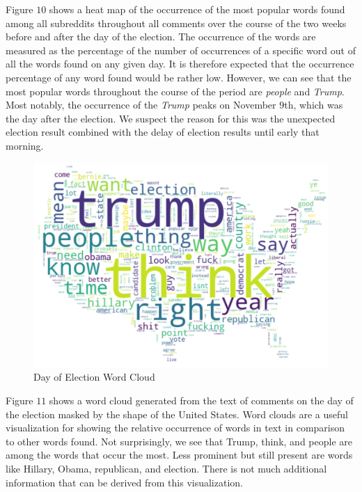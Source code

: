 \documentclass[letterpaper]{article}
\begin{document}
Figure $10$ shows a heat map of the occurrence of the most popular words found among all subreddits throughout all comments over the course of the two weeks before and after the day of the election. The occurrence of the words are measured as the percentage of the number of occurrences of a specific word out of all the words found on any given day. It is therefore expected that the occurrence percentage of any word found would be rather low. However, we can see that the most popular words throughout the course of the period are \textit{people} and \textit{Trump}. Most notably, the occurrence of the \textit{Trump} peaks on November $9$th, which was the day after the election. We suspect the reason for this was the unexpected election result combined with the delay of election results until early that morning.

\begin{figure}[!htb]
\begin{center}
\includegraphics[scale=0.5]{day-of-comments-mask.png}
\caption{Day of Election Word Cloud}
\label{fig1}
\end{center}
\end{figure}

Figure $11$ shows a word cloud generated from the text of comments on the day of the election masked by the shape of the United States. Word clouds are a useful visualization for showing the relative occurrence of words in text in comparison to other words found. Not surprisingly, we see that Trump, think, and people are among the words that occur the most. Less prominent but still present are words like Hillary, Obama, republican, and election. There is not much additional information that can be derived from this visualization.
\end{document}
